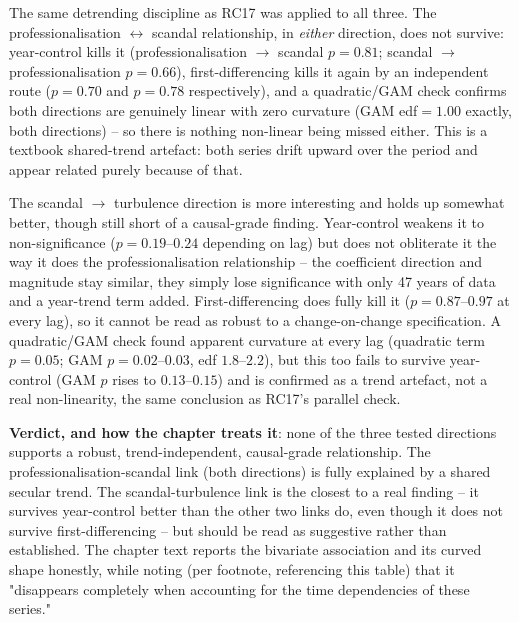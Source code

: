 The same detrending discipline as RC17 was applied to all three. The professionalisation
$\leftrightarrow$ scandal relationship, in \emph{either} direction, does not survive: year-control
kills it (professionalisation $\to$ scandal $p=0.81$; scandal $\to$ professionalisation $p=0.66$),
first-differencing kills it again by an independent route ($p=0.70$ and $p=0.78$ respectively),
and a quadratic/GAM check confirms both directions are genuinely linear with zero curvature (GAM
edf$=1.00$ exactly, both directions) -- so there is nothing non-linear being missed either. This
is a textbook shared-trend artefact: both series drift upward over the period and appear related
purely because of that.

The scandal $\to$ turbulence direction is more interesting and holds up somewhat better, though
still short of a causal-grade finding. Year-control weakens it to non-significance
($p=0.19$--$0.24$ depending on lag) but does not obliterate it the way it does the
professionalisation relationship -- the coefficient direction and magnitude stay similar, they
simply lose significance with only 47 years of data and a year-trend term added. First-differencing
does fully kill it ($p=0.87$--$0.97$ at every lag), so it cannot be read as robust to a
change-on-change specification. A quadratic/GAM check found apparent curvature at every lag
(quadratic term $p=0.05$; GAM $p=0.02$--$0.03$, edf $1.8$--$2.2$), but this too fails to survive
year-control (GAM $p$ rises to $0.13$--$0.15$) and is confirmed as a trend artefact, not a real
non-linearity, the same conclusion as RC17's parallel check.

\textbf{Verdict, and how the chapter treats it}: none of the three tested directions supports a
robust, trend-independent, causal-grade relationship. The professionalisation-scandal link (both
directions) is fully explained by a shared secular trend. The scandal-turbulence link is the
closest to a real finding -- it survives year-control better than the other two links do, even
though it does not survive first-differencing -- but should be read as suggestive rather than
established. The chapter text reports the bivariate association and its curved shape honestly,
while noting (per footnote, referencing this table) that it "disappears completely when accounting
for the time dependencies of these series."
